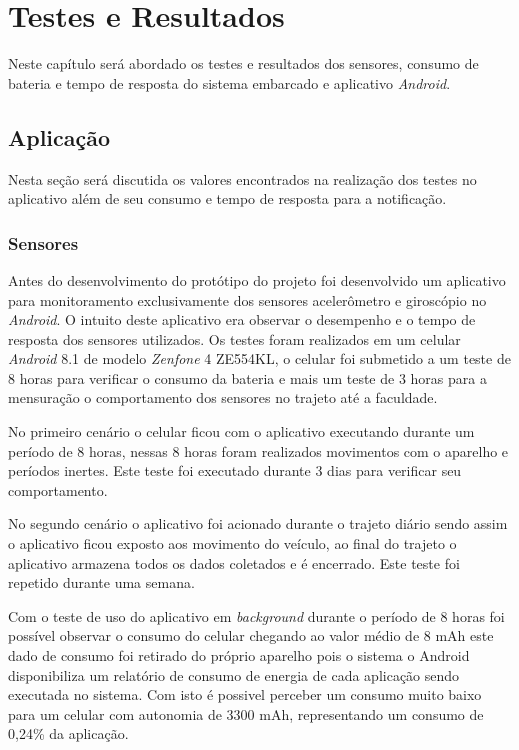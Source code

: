 \chapter{Testes e Resultados}\label{cap:conclusão}

Neste capítulo será abordado os testes e resultados dos sensores, consumo de bateria e tempo de resposta do sistema embarcado e aplicativo \textit{Android}.

\section{Aplicação}

Nesta seção será discutida os valores encontrados na realização dos testes no aplicativo além de seu consumo e tempo de resposta para a notificação.

\subsection{\textbf{Sensores}}


Antes do desenvolvimento do protótipo do projeto foi desenvolvido um aplicativo para monitoramento exclusivamente dos sensores acelerômetro e giroscópio no \textit{Android}. O intuito deste aplicativo era observar o desempenho e o tempo de resposta dos sensores utilizados. Os testes foram realizados em um celular \textit{Android} 8.1 de modelo \textit{Zenfone} 4 ZE554KL,  o celular foi submetido a um teste de  8 horas para verificar o consumo da bateria e mais  um teste de 3 horas para a mensuração o comportamento dos sensores no trajeto até a faculdade.


No primeiro cenário o celular ficou com o aplicativo executando durante um período de 8 horas, nessas 8 horas  foram realizados movimentos com o aparelho e  períodos inertes. Este teste foi executado durante 3 dias para verificar seu comportamento.

No segundo cenário o aplicativo foi acionado durante o trajeto diário sendo assim o aplicativo  ficou exposto aos movimento do veículo, ao final do trajeto o aplicativo armazena todos os dados coletados e é encerrado. Este teste foi repetido durante uma semana.


Com o teste de uso do aplicativo em \textit{background} durante o período de 8 horas foi possível observar o consumo do celular chegando ao valor médio de 8 mAh  este dado de consumo foi retirado do próprio aparelho pois o sistema  o Android disponibiliza um relatório de consumo de energia de cada aplicação sendo executada no sistema. Com isto é possivel perceber um consumo muito baixo para um celular com autonomia de  3300 mAh, representando um consumo de 0,24\% da aplicação. 



